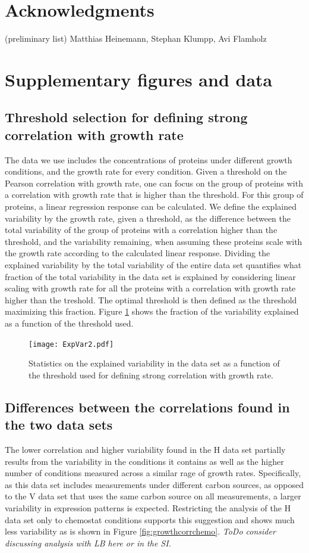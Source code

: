 \documentclass[notitlepage]{article}
\begin{document}
\section{Acknowledgments}
(preliminary list) Matthias Heinemann, Stephan Klumpp, Avi Flamholz
\section{Supplementary figures and data}
\subsection{Threshold selection for defining strong correlation with growth rate}
\label{corrthreshold}
The data we use includes the concentrations of proteins under different growth conditions, and the growth rate for every condition.
Given a threshold on the Pearson correlation with growth rate, one can focus on the group of proteins with a correlation with growth rate that is higher than the threshold.
For this group of proteins, a linear regression response can be calculated.
We define the explained variability by the growth rate, given a threshold, as the difference between the total variability of the group of proteins with a correlation higher than the threshold, and the variability remaining, when assuming these proteins scale with the growth rate according to the calculated linear response.
Dividing the explained variability by the total variability of the entire data set quantifies what fraction of the total variability in the data set is explained by considering linear scaling with growth rate for all the proteins with a correlation with growth rate higher than the treshold.
The optimal threshold is then defined as the threshold maximizing this fraction.
Figure \ref{fig:threshold} shows the fraction of the variability explained as a function of the threshold used. 
\begin{figure}[h]
\centering
\texttt{[image: ExpVar2.pdf]}
\caption{
  Statistics on the explained variability in the data set as a function of the threshold used for defining strong correlation with growth rate.
}
\label{fig:threshold}
\end{figure}

\subsection{Differences between the correlations found in the two data sets}
\label{heinemannchemo}
The lower correlation and higher variability found in the H data set partially results from the variability in the conditions it contains as well as the higher number of conditions measured across a similar rage of growth rates.
Specifically, as this data set includes measurements under different carbon sources, as opposed to the V data set that uses the same carbon source on all measurements, a larger variability in expression patterns is expected.
Restricting the analysis of the H data set only to chemostat conditions supports this suggestion and shows much less variability as is shown in Figure \ref{fig:growthcorrchemo}.
\emph{ToDo consider discussing analysis with LB here or in the SI.}
\end{document}
